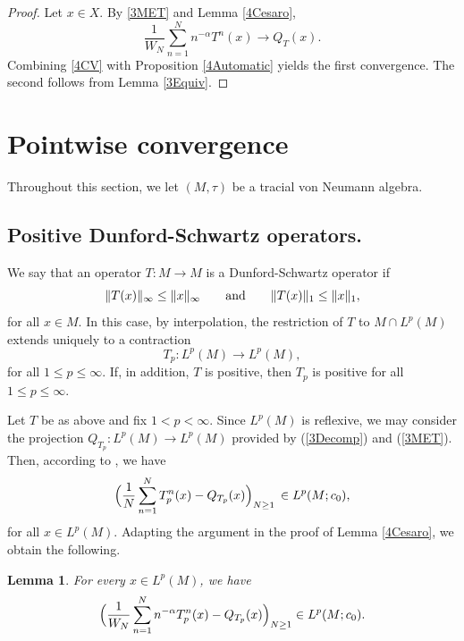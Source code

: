 \documentclass[12pt]{amsart}
\newcommand{\norm}[1]{\Vert#1\Vert}
\newtheorem{lemma}[theorem]{Lemma}
\theoremstyle{remark}
\theoremstyle{definition}
\numberwithin{equation}{section}
\begin{document}
\begin{proof}
Let $x \in X$. By \eqref{3MET} and Lemma \ref{4Cesaro},
\begin{equation}\label{4CV}
\frac{1}{W_N}\sum_{n=1}^N n^{-\alpha} T^n(x) \longrightarrow Q_T(x).
\end{equation}
Combining \eqref{4CV} with Proposition \ref{4Automatic} yields the first convergence.  The second follows from Lemma \ref{3Equiv}.
\end{proof}



\section{Pointwise convergence}\label{5}

Throughout this section, we let $(M,\tau)$ be a tracial von Neumann algebra.



\subsection{Positive Dunford-Schwartz operators.} We say that an operator $T\colon M\to M$ is a  Dunford-Schwartz operator if $$
\norm{T(x)}_\infty\leq \norm{x}_\infty
\qquad \hbox{and}\qquad
\norm{T(x)}_1\leq \norm{x}_1,
$$
for all $x\in M$. In this case, by interpolation,
the restriction of $T$ to $M\cap L^p(M)$ extends uniquely to a contraction
$$
T_p\colon L^p(M)\longrightarrow L^p(M),
$$
for all $1\leq p\leq \infty$. If, in addition, $T$ is positive,
then $T_p$ is positive for all $1\leq p\leq \infty$.

Let $T$ be as above and fix $1<p<\infty$.
Since $L^p(M)$ is reflexive, we may consider the projection
$Q_{T_p}\colon L^p(M)\to L^p(M)$
provided by (\ref{3Decomp}) and (\ref{3MET}).
Then, according to \cite[Theorem 6.3]{JX}, we have
\begin{equation}\label{5c0}
\Bigl(\frac{1}{N}\sum_{n=1}^N T_p^n(x)
- Q_{T_p}(x)\Bigr)_{N\geq1}\,\in L^p(M;c_0),
\end{equation}
for all $x\in L^p(M)$. Adapting the argument in the proof of 
Lemma \ref{4Cesaro}, we obtain the following.

\begin{lemma}\label{5Cesaro}
For every $x\in L^p(M)$, we have
$$
\Bigl(\frac{1}{W_N}\sum_{n=1}^N n^{-\alpha} T_p^n(x)
- Q_{T_p}(x)\Bigr)_{N\geq1}\in L^p(M;c_0).
$$
\end{lemma}
\end{document}

